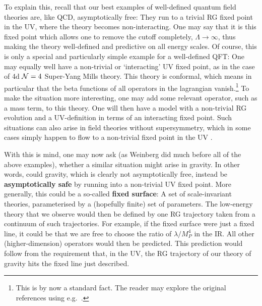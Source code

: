 \documentclass[12pt]{article}
\numberwithin{equation}{section}
\begin{document}
To explain this, recall that our best examples of well-defined quantum field theories are, like QCD, asymptotically free: They run to a trivial RG fixed point in the UV, where the theory becomes non-interacting. One may say that it is this fixed point which allows one to remove the cutoff completely, $\Lambda\to\infty$, thus making the theory well-defined and predictive on all energy scales. Of course, this is only a special and particularly simple example for a well-defined QFT: One may equally well have a non-trivial or `interacting' UV fixed point, as in the case of 4d ${\cal N}=4$ Super-Yang Mills theory. This theory is conformal, which means in particular that the beta functions of all operators in the lagrangian vanish.\footnote{
This 
is by now a standard fact.
The reader may explore the original references using e.g.~\cite{Brink:2015ust}.
} 
To make the situation more interesting, one may add some relevant operator, such as a mass term, to this theory. One will then have a model with a non-trivial RG evolution and a UV-definition in terms of an interacting fixed point. Such situations can also arise in field theories without supersymmetry, which in some cases simply happen to flow to a non-trivial fixed point in the UV \cite{Litim:2014uca}.

With this is mind, one may now ask (as Weinberg did much before all of the above examples), whether a similar situation might arise in gravity. In other words, could gravity, which is clearly not asymptotically free, instead be {\bf asymptotically safe} by running into a non-trivial UV fixed point. More generally, this could be a so-called {\bf fixed surface}: A set of scale-invariant theories, parameterised by a (hopefully finite) set of parameters. The low-energy theory that we observe would then be defined by one RG trajectory taken from a continuum of such trajectories. For example, if the fixed surface were just a fixed line, it could be that we are free to choose the ratio of $\lambda/M_P^4$ in the IR. All other (higher-dimension) operators would then be predicted. This prediction would follow from the requirement that, in the UV, the RG trajectory of our theory of gravity hits the fixed line just described.
\end{document}
